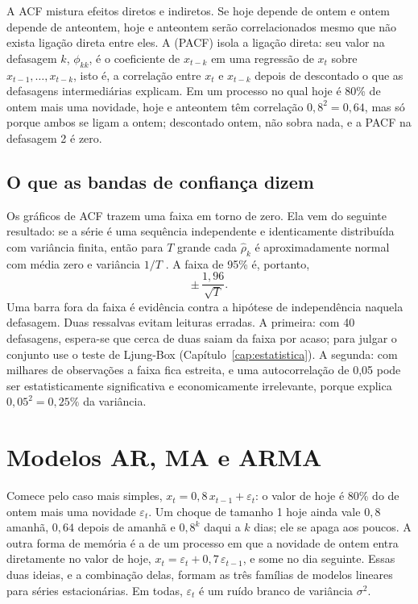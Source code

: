 A ACF mistura efeitos diretos e indiretos. Se hoje depende de ontem e ontem depende de anteontem, hoje e anteontem serão correlacionados mesmo que não exista ligação direta entre eles. A  (PACF) isola a ligação direta: seu valor na defasagem $k$, $\phi_{kk}$, é o coeficiente de $x_{t-k}$ em uma regressão de $x_t$ sobre $x_{t-1}, \dots, x_{t-k}$, isto é, a correlação entre $x_t$ e $x_{t-k}$ depois de descontado o que as defasagens intermediárias explicam. Em um processo no qual hoje é 80\% de ontem mais uma novidade, hoje e anteontem têm correlação $0,8^2 = 0,64$, mas só porque ambos se ligam a ontem; descontado ontem, não sobra nada, e a PACF na defasagem 2 é zero.

\subsection{O que as bandas de confiança dizem}

Os gráficos de ACF trazem uma faixa em torno de zero. Ela vem do seguinte resultado: se a série é uma sequência independente e identicamente distribuída com variância finita, então para $T$ grande cada $\hat\rho_k$ é aproximadamente normal com média zero e variância $1/T$ \citep{box2015}. A faixa de 95\% é, portanto,
\begin{equation}
  \pm\,\frac{1,96}{\sqrt{T}} .
  \label{eq:c06-banda}
\end{equation}
Uma barra fora da faixa é evidência contra a hipótese de independência naquela defasagem. Duas ressalvas evitam leituras erradas. A primeira: com 40 defasagens, espera-se que cerca de duas saiam da faixa por acaso; para julgar o conjunto use o teste de Ljung-Box (Capítulo~\ref{cap:estatistica}). A segunda: com milhares de observações a faixa fica estreita, e uma autocorrelação de 0,05 pode ser estatisticamente significativa e economicamente irrelevante, porque explica $0,05^2 = 0,25\%$ da variância.

\section{Modelos AR, MA e ARMA}
\label{sec:c06-arma}

Comece pelo caso mais simples, $x_t = 0,8\,x_{t-1} + \varepsilon_t$: o valor de hoje é 80\% do de ontem mais uma novidade $\varepsilon_t$. Um choque de tamanho 1 hoje ainda vale $0,8$ amanhã, $0,64$ depois de amanhã e $0,8^k$ daqui a $k$ dias; ele se apaga aos poucos. A outra forma de memória é a de um processo em que a novidade de ontem entra diretamente no valor de hoje, $x_t = \varepsilon_t + 0,7\,\varepsilon_{t-1}$, e some no dia seguinte. Essas duas ideias, e a combinação delas, formam as três famílias de modelos lineares para séries estacionárias. Em todas, $\varepsilon_t$ é um ruído branco de variância $\sigma^2$.

